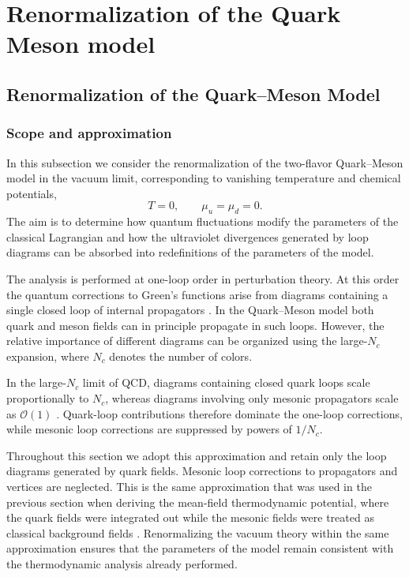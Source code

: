 \chapter{Renormalization of the Quark Meson model}

\section{Renormalization of the Quark--Meson Model}

\subsection{Scope and approximation}

In this subsection we consider the renormalization of the two-flavor
Quark--Meson model in the vacuum limit, corresponding to vanishing
temperature and chemical potentials,
\begin{equation}
T = 0, \qquad \mu_u = \mu_d = 0 .
\end{equation}
The aim is to determine how quantum fluctuations modify the parameters
of the classical Lagrangian and how the ultraviolet divergences
generated by loop diagrams can be absorbed into redefinitions of the
parameters of the model.

The analysis is performed at one-loop order in perturbation theory.
At this order the quantum corrections to Green's functions arise from
diagrams containing a single closed loop of internal propagators
\cite{PeskinSchroeder1995,WeinbergQFT}. In the Quark--Meson model both
quark and meson fields can in principle propagate in such loops.
However, the relative importance of different diagrams can be
organized using the large-$N_c$ expansion, where $N_c$ denotes the
number of colors.

In the large-$N_c$ limit of QCD, diagrams containing closed quark
loops scale proportionally to $N_c$, whereas diagrams involving only
mesonic propagators scale as $\mathcal{O}(1)$
\cite{SchaeferWambach2008}. Quark-loop contributions therefore
dominate the one-loop corrections, while mesonic loop corrections are
suppressed by powers of $1/N_c$.

Throughout this section we adopt this approximation and retain only
the loop diagrams generated by quark fields. Mesonic loop corrections
to propagators and vertices are neglected. This is the same
approximation that was used in the previous section when deriving the
mean-field thermodynamic potential, where the quark fields were
integrated out while the mesonic fields were treated as classical
background fields \cite{Folkestad2018,Andersen2024}. Renormalizing the
vacuum theory within the same approximation ensures that the
parameters of the model remain consistent with the thermodynamic
analysis already performed.

